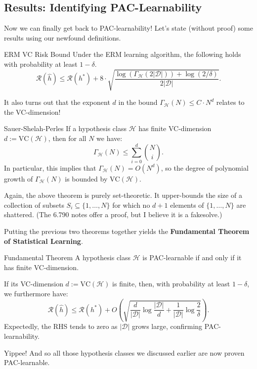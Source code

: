 \subsection{Results: Identifying PAC-Learnability}

Now we can finally get back to PAC-learnability!
Let's state (without proof) some results using our newfound definitions.

\begin{theorem}{ERM VC Risk Bound}
    Under the ERM learning algorithm,
    the following holds with probability at least $1 - \delta$.
    \[
    \mathcal{R}(\hat{h}) \leq
    \mathcal{R}(h^*) + 8 \cdot \sqrt{
        \frac{\log\left(\Gamma_{\mathcal{H}}(2|\mathcal{D}|)\right)
        + \log(2/\delta)}{2|\mathcal{D}|}
    }.
    \]
\end{theorem}

It also turns out that the exponent $d$
in the bound $\Gamma_{\mathcal{H}}(N) \leq C \cdot N^d$
relates to the VC-dimension!

\begin{theorem}{Sauer-Shelah-Perles}
    If a hypothesis class $\mathcal{H}$
    has finite VC-dimension $d := \mathrm{VC}(\mathcal{H})$, then
    for all $N$ we have:
    \[ \Gamma_{\mathcal{H}}(N) \leq \sum_{i = 0}^d \binom{N}{i}. \]
    In particular, this implies that
    $\Gamma_{\mathcal{H}}(N) = O(N^d)$,
    so the degree of polynomial growth of $\Gamma_{\mathcal{H}}(N)$
    is bounded by $\mathrm{VC}(\mathcal{H})$.
\end{theorem}

\begin{remark}
    Again, the above theorem is purely set-theoretic.
    It upper-bounds the size of a collection of subsets
    $S_i \subseteq \{1, \dots, N\}$ for which 
    no $d + 1$ elements of $\{1, \dots, N\}$ are shattered.
    (The 6.790 notes offer a proof, but I believe it is a fakesolve.)
\end{remark}

Putting the previous two theorems together
yields the \textbf{Fundamental Theorem of Statistical Learning}.

\begin{theorem}{Fundamental Theorem}
    A hypothesis class $\mathcal{H}$ is PAC-learnable
    if and only if it has finite VC-dimension.

    If its VC-dimension $d := \mathrm{VC}(\mathcal{H})$ is finite,
    then, with probability at least $1 - \delta$, we furthermore have:
    \[
    \mathcal{R}(\hat{h}) \leq \mathcal{R}(h^*) + O\left(
        \sqrt{\frac{d}{|\mathcal{D}|} \log \frac{|\mathcal{D}|}{d}
        + \frac{1}{|\mathcal{D}|} \log \frac{2}{\delta}}
    \right).
    \]
    Expectedly, the RHS tends to zero as $|\mathcal{D}|$ grows large,
    confirming PAC-learnability.
\end{theorem}

Yippee!  And so all those hypothesis classes
we discussed earlier are now proven PAC-learnable.

